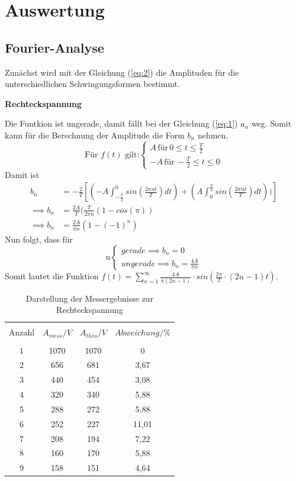 \section{Auswertung}
\subsection{Fourier-Analyse}
Zunächst wird mit der Gleichung (\ref{eq:2}) die Amplituden für die unterschiedlichen
Schwingungsformen bestimmt.\\
\centerline{\textbf{Rechteckspannung}}
Die Funtkion ist ungerade, damit fällt bei der Gleichung (\ref{eq:1}) $a_n$ weg.
Somit kann für die Berechnung der Amplitude die Form $b_n$ nehmen.
\begin{equation*}
  \text{Für $f(t)$ gilt:}
  \begin{cases}
    A \, \text{für} \, 0 \leq t \leq \frac{T}{2} \\
    -A \, \text{für} \, -\frac{T}{2} \leq t \leq 0
  \end{cases}
\end{equation*}
Damit ist
\begin{align*}
  b_n &= -\frac{2}{T} [(-A \int_{-\frac{T}{2}}^0 sin(\frac{2\pi nt}{T})dt) + (A \int_0^{\frac{T}{2}} sin(\frac{2\pi nt}{T})dt))]\\
\implies b_n &=\frac{2A}{T} (\frac{T}{2\pi n}(1-cos(\pi))\\
\implies b_n &= \frac{2A}{\pi n}(1-(-1)^n)
\end{align*}
Nun folgt, dass für
\begin{equation*}
  \text{n}
  \begin{cases}
    gerade \implies b_n = 0 \,\, \\
    ungerade \implies b_n = \frac{4A}{\pi n}
  \end{cases}
\end{equation*}
Somit lautet die Funktion $f(t) = \sum^{\infty}_{n=1} \frac{4A}{\pi (2n-1)} \cdot sin(\frac{2\pi}{T}\cdot(2n-1)t)$.
\begin{table}[H]
  \centering
  \begin{tabular}{c c c c}
    \toprule\\
    Anzahl & $A_{mess} / V$ & $A_{theo} / V$ & $Abweichung / \% $\\
    \midrule \\
    1 & 1070 & 1070 & 0 \\
    2 & 656  & 681 & 3,67\\
    3 & 440  & 454 & 3,08\\
    4 & 320  & 340 & 5,88\\
    5 & 288  & 272 & 5.88\\
    6 & 252  & 227 & 11,01\\
    7 & 208  & 194 & 7,22\\
    8 & 160  & 170 & 5,88\\
    9 & 158  & 151 & 4,64\\
    \bottomrule
  \end{tabular}
  \caption{Darstellung der Messergebnisse zur Rechteckspannung}
  \label{tab:1}
\end{table}
